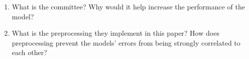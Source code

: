 \documentclass{article}
\begin{document}
\begin{enumerate}

    \item What is the committee? Why would it help increase the performance of the model?
    
    \item What is the preprocessing they implement in this paper? How does preprocessing prevent the models' errors from being strongly correlated to each other?
    
\end{enumerate}
\end{document}
